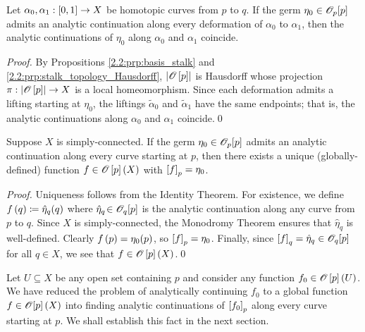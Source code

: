 \documentclass[../Moduli_Spaces_of_Riemann_Surfaces.tex]{subfiles}
\begin{document}
    \begin{corollary}
        Let $\alpha_0,\alpha_1:\left[0,1\right]\to X$ be homotopic curves from $p$ to $q$. If the germ $\eta_0\in\mathscr{O}_p\!\left[p\right]$ admits an analytic continuation along every deformation of $\alpha_0$ to $\alpha_1$, then the analytic continuations of $\eta_0$ along $\alpha_0$ and $\alpha_1$ coincide.
    \end{corollary}
    \begin{proof}
        By Propositions \ref{2.2:prp:basis_stalk} and \ref{2.2:prp:stalk_topology_Hausdorff}, $\left|\mathscr{O}\left[p\right]\right|$ is Hausdorff whose projection $\pi:\left|\mathscr{O}\left[p\right]\right|\to X$ is a local homeomorphism. Since each deformation admits a lifting starting at $\eta_0$, the liftings $\tilde{\alpha}_0$ and $\tilde{\alpha}_1$ have the same endpoints; that is, the analytic continuations along $\alpha_0$ and $\alpha_1$ coincide.\qed
    \end{proof}
    \begin{corollary}
        Suppose $X$ is simply-connected. If the germ $\eta_0\in\mathscr{O}_p\!\left[p\right]$ admits an analytic continuation along every curve starting at $p$, then there exists a unique (globally-defined) function $f\in\mathscr{O}\left[p\right]\left(X\right)$ with $\left[f\right]_p=\eta_0$.
    \end{corollary}
    \begin{proof}
        Uniqueness follows from the Identity Theorem. For existence, we define $f\left(q\right)\coloneqq\hat{\eta}_q\!\left(q\right)$ where $\hat{\eta}_q\!\in\mathscr{O}_q\!\left[p\right]$ is the analytic continuation along any curve from $p$ to $q$. Since $X$ is simply-connected, the Monodromy Theorem ensures that $\hat{\eta}_q$ is well-defined. Clearly $f\left(p\right)=\eta_0\!\left(p\right)$, so $\left[f\right]_p=\eta_0$. Finally, since $\left[f\right]_q=\hat{\eta}_q\in\mathscr{O}_q\!\left[p\right]$ for all $q\in X$, we see that $f\in\mathscr{O}\left[p\right]\left(X\right)$.\qed
    \end{proof}
    \begin{remark}
        Let $U\subseteq X$ be any open set containing $p$ and consider any function $f_0\in\mathscr{O}\left[p\right]\left(U\right)$. We have reduced the problem of analytically continuing $f_0$ to a global function $f\in\mathscr{O}[p]\left(X\right)$ into finding analytic continuations of $\left[f_0\right]_p$ along every curve starting at $p$. We shall establish this fact in the next section.\exqed
    \end{remark}
\end{document}
